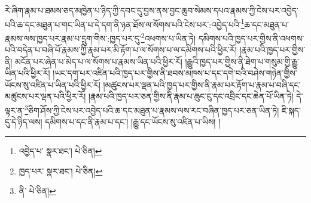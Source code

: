 རེ་ཞིག་རྣམ་པ་ཐམས་ཅད་མཁྱེན་པ་ཉིད་ཀྱི་དབང་དུ་བྱས་ནས་བྱང་ཆུབ་སེམས་དཔའ་རྣམས་ཀྱི་ངེས་པར་འབྱེད་པའི་ཆ་དང་མཐུན་པ་གང་ཡིན་པ་དེ་དག་ནི་ཉན་ཐོས་ལ་སོགས་པའི་ངེས་པར་:འབྱེད་པའི་\footnote{འབྱེད་པ་  སྣར་ཐང་།  པེ་ཅིན། }ཆ་དང་མཐུན་པ་རྣམས་ལས་ཁྱད་པར་རྣམ་པ་དྲུག་གིས་:ཁྱད་པར་དུ་\footnote{ཁྱད་པར་  སྣར་ཐང་།  པེ་ཅིན། }འཕགས་པ་ཡིན་ཏེ། དམིགས་པའི་ཁྱད་པར་གྱིས་ནི་འཕགས་པའི་བདེན་པ་བཞི་པོ་རྣམས་ཀྱི་རྣམ་པར་མི་རྟོག་པ་ལ་སོགས་པ་ལ་དམིགས་པའི་ཕྱིར་རོ། །རྣམ་པའི་ཁྱད་པར་གྱིས་ནི། མངོན་པར་ཞེན་པ་མེད་པ་ལ་སོགས་པ་རྣམས་ཡིན་པའི་ཕྱིར་རོ། །རྒྱུའི་ཁྱད་པར་གྱིས་ནི་ཐེག་པ་གསུམ་གྱི་རྒྱུ་ཡིན་པའི་ཕྱིར་རོ། །ཡང་དག་པར་འཛིན་པའི་ཁྱད་པར་གྱིས་ནི་ཐབས་མཁས་པ་དང་དགེ་བའི་བཤེས་གཉེན་གྱིས་ཡོངས་སུ་འཛིན་པ་ཡིན་པའི་ཕྱིར་རོ། །མཚུངས་པར་ལྡན་པའི་ཁྱད་པར་གྱིས་ནི་རྣམ་པར་རྟོག་པ་རྣམ་པ་བཞི་དང་མཚུངས་པར་ལྡན་པའི་ཕྱིར་རོ། །རྣམ་པའི་ཁྱད་པར་ཅན་གྱིས་ནི་རྣམ་པ་ཆུང་ངུ་དང་འབྲིང་དང་ཆེན་པོ་ཡིན་ཏེ། དེ་ལྟར་ན་\footnote{ནི་  པེ་ཅིན། }ཅིག་ཤོས་ཀྱི་ངེས་པར་འབྱེད་པའི་ཆ་དང་མཐུན་པ་རྣམས་ལས་རང་བཞིན་ཁྱད་པར་ཅན་ཡིན་ཏེ། ཇི་སྐད་དུ་དེ་ཉིད་ལས། དམིགས་པ་དང་ནི་རྣམ་པ་དང་། །རྒྱུ་དང་ཡོངས་སུ་འཛིན་པ་ཡིས། །
